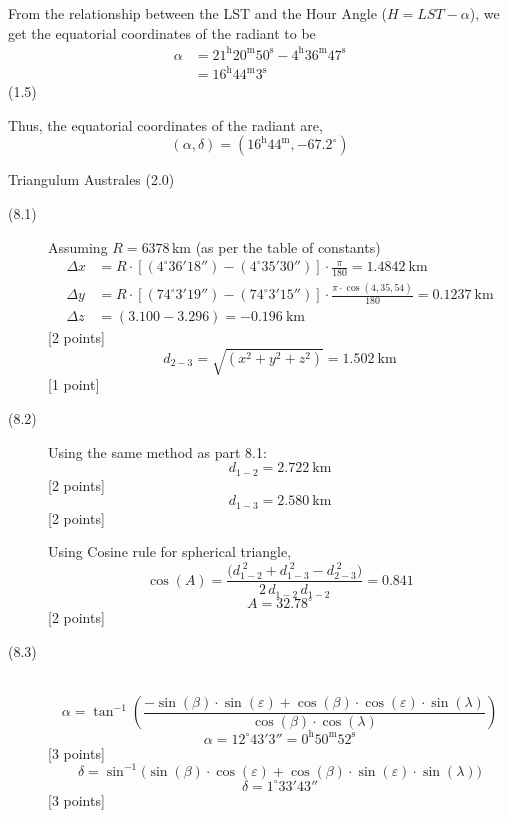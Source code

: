 \begin{description}
  From the relationship between the LST and the Hour Angle
  ($H = LST - \alpha$), we get the equatorial coordinates of the radiant to be
  \begin{align*}
    \alpha &= 21^{\mathrm{h}}20^{\mathrm{m}}50^{\mathrm{s}}
              - 4^{\mathrm{h}}36^{\mathrm{m}}47^{\mathrm{s}}\\
           &= 16^{\mathrm{h}}44^{\mathrm{m}}3^{\mathrm{s}}
  \end{align*}
  \hfill(1.5)

  Thus, the equatorial coordinates of the radiant are,
  \[
    (\alpha, \delta) = (16^{\mathrm{h}}44^{\mathrm{m}}, -67.2^\circ)
  \]

\item[(d)] Triangulum Australes \hfill(2.0)
\end{description}

\begin{description}
\item[(8.1)] Assuming $R = 6378$\,km (as per the table of constants)
  \begin{align*}
    \Delta x &= R \cdot
      \left[(4^\circ 36' 18'') - (4^\circ 35' 30'')\right]
      \cdot \frac{\pi}{180} = 1.4842\ \mathrm{km}\\
    \Delta y &= R \cdot
      \left[(74^\circ 3' 19'') - (74^\circ 3' 15'')\right]
      \cdot \frac{\pi \cdot \cos(4,35,54)}{180} = 0.1237\ \mathrm{km}\\
    \Delta z &= (3.100 - 3.296) = -0.196\ \mathrm{km}
  \end{align*}
  \hfill[2 points]
  \[
    d_{2-3} = \sqrt{(x^2 + y^2 + z^2)} = 1.502\ \mathrm{km}
  \]
  \hfill[1 point]

\item[(8.2)] Using the same method as part 8.1:
  \[
    d_{1-2} = 2.722\ \mathrm{km}
  \]
  \hfill[2 points]
  \[
    d_{1-3} = 2.580\ \mathrm{km}
  \]
  \hfill[2 points]

  Using Cosine rule for spherical triangle,
  \[
    \cos(A) = \frac{\bigl(d_{1-2}^{\;2} + d_{1-3}^{\;2}
                          - d_{2-3}^{\;2}\bigr)}
                   {2\,d_{1-2}\,d_{1-2}} = 0.841
  \]
  \[
    A = 32.78^\circ
  \]
  \hfill[2 points]

\item[(8.3)] ~
  \[
    \alpha = \tan^{-1}\left(
      \frac{-\sin(\beta)\cdot\sin(\varepsilon)
            + \cos(\beta)\cdot\cos(\varepsilon)\cdot\sin(\lambda)}
           {\cos(\beta)\cdot\cos(\lambda)}\right)
  \]
  \[
    \alpha = 12^\circ 43' 3''
           = 0^{\mathrm{h}} 50^{\mathrm{m}} 52^{\mathrm{s}}
  \]
  \hfill[3 points]
  \[
    \delta = \sin^{-1}\bigl(\sin(\beta)\cdot\cos(\varepsilon)
             + \cos(\beta)\cdot\sin(\varepsilon)\cdot\sin(\lambda)\bigr)
  \]
  \[
    \delta = 1^\circ 33' 43''
  \]
  \hfill[3 points]
\end{description}


